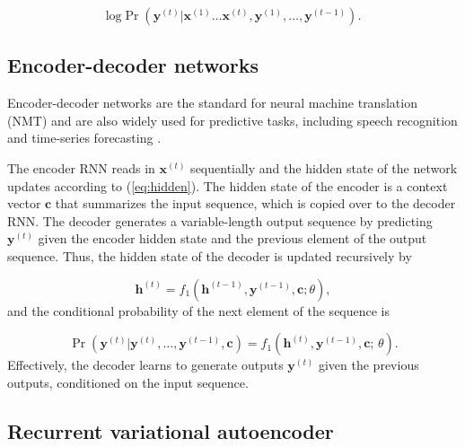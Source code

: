 \begin{equation} \label{rnn-obj}
\text{log} \Pr \left(\boldsymbol{y}^{(t)} | \boldsymbol{x}^{(1)} \ldots \boldsymbol{x}^{(t)},\boldsymbol{y}^{(1)}, \ldots, \boldsymbol{y}^{(t-1)} \right).
\end{equation}

\subsection{Encoder-decoder networks}

Encoder-decoder networks are the standard for neural machine translation (NMT) \citep{cho2014learning,bahdanau2014neural,vinyals2014grammar} and are also widely used for predictive tasks, including speech recognition \citep{chorowski2015attention} and time-series forecasting \citep{zhu2017deep}. 

The encoder RNN reads in $\boldsymbol{x}^{(t)}$ sequentially and the hidden state of the network updates according to (\ref{eq:hidden}). The hidden state of the encoder is a context vector $\boldsymbol{c}$ that summarizes the input sequence, which is copied over to the decoder RNN. The decoder generates a variable-length output sequence by predicting $\boldsymbol{y}^{(t)}$ given the encoder hidden state and the previous element of the output sequence. Thus, the hidden state of the decoder is updated recursively by

\begin{equation}
\boldsymbol{h}^{(t)} = f_1 \left( \boldsymbol{h}^{(t-1)}, \boldsymbol{y}^{(t-1)}, \boldsymbol{c}; \theta \right), \label{eq:decoder}
\end{equation} and the conditional probability of the next element of the sequence is 

\begin{equation}
\Pr (\boldsymbol{y}^{(t)} | \boldsymbol{y}^{(t)}, \ldots, \boldsymbol{y}^{(t-1)}, \boldsymbol{c}) =  f_1 \left( \boldsymbol{h}^{(t)}, \boldsymbol{y}^{(t-1)}, \boldsymbol{c}; \, \theta \right).
\end{equation}  Effectively, the decoder learns to generate outputs $\boldsymbol{y}^{(t)}$ given the previous outputs, conditioned on the input sequence. 

\subsection{Recurrent variational autoencoder}


